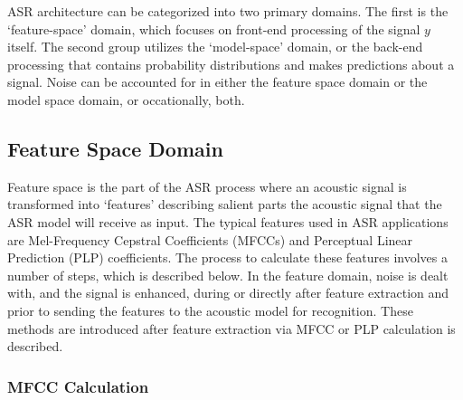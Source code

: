 ASR architecture can be categorized into two primary domains. The first is the `feature-space' domain, which focuses on front-end processing of the signal $y$ itself.  The second group utilizes the `model-space' domain, or the back-end processing that contains probability distributions and makes predictions about a signal. %
Noise can be accounted for in either the feature space domain or the model space domain, or occationally, both.  %

\subsection{Feature Space Domain}

Feature space is the part of the ASR process where an acoustic signal is transformed into `features' describing salient parts the acoustic signal that the ASR model will receive as input. The typical features used in ASR applications are Mel-Frequency Cepstral Coefficients (MFCCs) and Perceptual Linear Prediction (PLP) coefficients. The process to calculate these features involves a number of steps, which is described below.  In the feature domain, noise is dealt with, and the signal is enhanced, during or directly after feature extraction and prior to sending the features to the acoustic model for recognition.  These methods are introduced after feature extraction via MFCC or PLP calculation is described.

\subsubsection{MFCC Calculation}\label{sec:mfcc-calc}

